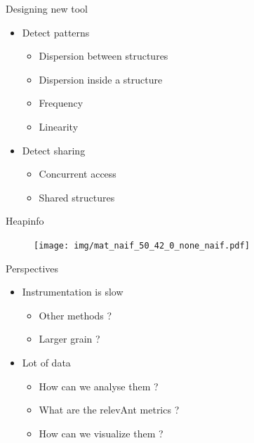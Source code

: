 \documentclass[xcolor={usenames,dvipsnames}]{beamer}
\begin{document}
\begin{frame}{Designing new tool}
    \begin{itemize}
        \item Detect patterns
            \begin{itemize}
                \item Dispersion between structures
                \item Dispersion inside a structure
                \item Frequency
                \item Linearity
            \end{itemize}
        \item Detect sharing
            \begin{itemize}
                \item Concurrent access
                \item Shared structures
            \end{itemize}
    \end{itemize}
\end{frame}
\begin{frame}{Heapinfo \cite{Beniamine13Cartographier}}
    \begin{figure}
        \centering
        \texttt{[image: img/mat\_naif\_50\_42\_0\_none\_naif.pdf]}
    \end{figure}
\end{frame}

\setcounter{finalframe}{\value{framenumber}}
\begin{frame}{Perspectives}
    \begin{itemize}
        \item Instrumentation is slow
            \begin{itemize}
                \item Other methods ?
                \item Larger grain ?
            \end{itemize}
        \item Lot of data
            \begin{itemize}
                \item How can we analyse them ?
                \item What are the relevAnt metrics ?
                \item How can we visualize them ? 
            \end{itemize}
    \end{itemize}
\end{frame}
\end{document}
